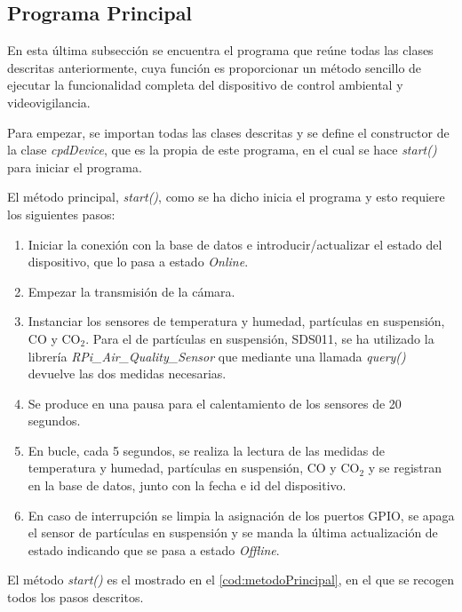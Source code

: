 \subsection{Programa Principal}
En esta última subsección se encuentra el programa que reúne todas las clases descritas anteriormente, cuya función es proporcionar un método sencillo de ejecutar la funcionalidad completa del dispositivo de control ambiental y videovigilancia.

Para empezar, se importan todas las clases descritas y se define el constructor de la clase \textit{cpdDevice}, que es la propia de este programa, en el cual se hace \textit{start()} para iniciar el programa.

El método principal, \textit{start()}, como se ha dicho inicia el programa y esto requiere los siguientes pasos:
\begin{enumerate}
    \item Iniciar la conexión con la base de datos e introducir/actualizar el estado del dispositivo, que lo pasa a estado \textit{Online}.
    \item Empezar la transmisión de la cámara.
    \item Instanciar los sensores de temperatura y humedad, partículas en suspensión, CO y CO$_2$. Para el de partículas en suspensión, SDS011, se ha utilizado la librería \textit{RPi\_Air\_Quality\_Sensor} \cite{rovai_python4ds_2021} que mediante una llamada \textit{query()} devuelve las dos medidas necesarias.
    \item Se produce en una pausa para el calentamiento de los sensores de 20 segundos.
    \item En bucle, cada 5 segundos, se realiza la lectura de las medidas de temperatura y humedad, partículas en suspensión, CO y CO$_2$ y se registran en la base de datos, junto con la fecha e id del dispositivo.
    \item En caso de interrupción se limpia la asignación de los puertos GPIO, se apaga el sensor de partículas en suspensión y se manda la última actualización de estado indicando que se pasa a estado \textit{Offline}.
\end{enumerate}

El método \textit{start()} es el mostrado en el \autoref{cod:metodoPrincipal}, en el que se recogen todos los pasos descritos.
\pagebreak

